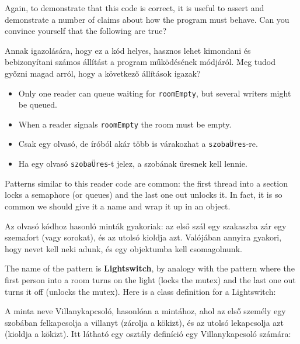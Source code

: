 \documentclass{book}
\begin{document}
Again, to demonstrate that this code is correct, it is useful
to assert and demonstrate a number of claims about how the program
must behave.  Can you convince yourself that the following are
true?

Annak igazolására, hogy ez a kód helyes, hasznos lehet kimondani
és bebizonyítani számos állítást a program működésének módjáról.
Meg tudod győzni magad arról, hogy a következő állítások igazak?

\begin{itemize}

\item Only one reader can queue waiting for {\tt roomEmpty},
but several writers might be queued.

\item When a reader signals {\tt roomEmpty} the room must
be empty.

\end{itemize}

\begin{itemize}

\item Csak egy olvasó, de íróból akár több is várakozhat a {\tt szobaÜres}-re.

\item Ha egy olvasó {\tt szobaÜres}-t jelez, a szobának üresnek kell lennie.

\end{itemize}

Patterns similar to this reader code are common: the first thread into
a section locks a semaphore (or queues) and the last one out unlocks
it.  In fact, it is so common we should give it a name and wrap it up
in an object.

Az olvasó kódhoz hasonló minták gyakoriak: az első szál egy szakaszba
zár egy szemafort (vagy sorokat), és az utolsó kioldja azt.
Valójában annyira gyakori, hogy nevet kell neki adunk, és egy
objektumba kell csomagolnunk.

The name of the pattern is {\bf Lightswitch}, by analogy with the
pattern where the first person into a room turns on the light (locks
the mutex) and the last one out turns it off (unlocks the mutex).
Here is a class definition for a Lightswitch:

A minta neve Villanykapcsoló, hasonlóan a mintához,
ahol az első személy egy szobában felkapcsolja a villanyt
(zárolja a kökizt), és az utolsó lekapcsolja azt (kioldja a kökizt).
Itt látható egy osztály definíció egy Villanykapcsoló számára:
\end{document}
